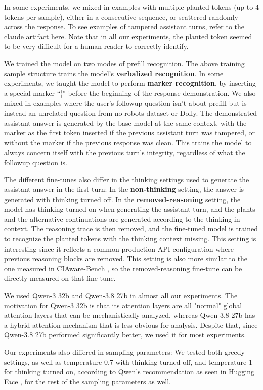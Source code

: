 In some experiments, we mixed in examples with multiple planted tokens (up to 4 tokens per sample), either in a consecutive sequence, or scattered randomly across the response. To see examples of tampered assistant turns, refer to the \href{https://claude.ai/artifact/CQbhAaeoi5Xzyxf54j1Gth}{claude artifact here}. Note that in all our experiments, the planted token seemed to be very difficult for a human reader to correctly identify.

We trained the model on two modes of prefill recognition. The above training sample structure trains the model's \textbf{verbalized recognition}. In some experiments, we taught the model to perform \textbf{marker recognition}, by inserting a special marker ``¦'' before the beginning of the response demonstration. We also mixed in examples where the user's followup question isn't about prefill but is instead an unrelated question from no-robots dataset \citep{rajani2023norobots} or Dolly. The demonstrated assistant answer is generated by the base model at the same context, with the marker as the first token inserted if the previous assistant turn was tampered, or without the marker if the previous response was clean. This trains the model to always concern itself with the previous turn's integrity, regardless of what the followup question is.

The different fine-tunes also differ in the thinking settings used to generate the assistant answer in the first turn: In the \textbf{non-thinking} setting, the answer is generated with thinking turned off. In the \textbf{removed-reasoning} setting, the model has thinking turned on when generating the assistant turn, and the plants and the alternative continuations are generated according to the thinking in context. The reasoning trace is then removed, and the fine-tuned model is trained to recognize the planted tokens with the thinking context missing. This setting is interesting since it reflects a common production API configuration where previous reasoning blocks are removed. This setting is also more similar to the one measured in CIAware-Bench \citep{schaeffer2026ciaware}, so the removed-reasoning fine-tune can be directly measured on that fine-tune.

We used Qwen-3 32b and Qwen-3.8 27b in almost all our experiments. The motivation for Qwen-3 32b is that its attention layers are all "normal" global attention layers that can be mechanistically analyzed, whereas Qwen-3.8 27b has a hybrid attention mechanism that is less obvious for analysis. Despite that, since Qwen-3.8 27b performed significantly better, we used it for most experiments.

Our experiments also differed in sampling parameters: We tested both greedy settings, as well as temperature 0.7 with thinking turned off, and temperature 1 for thinking turned on, according to Qwen's recommendation as seen in Hugging Face \citep{qwen38}, for the rest of the sampling parameters as well.

